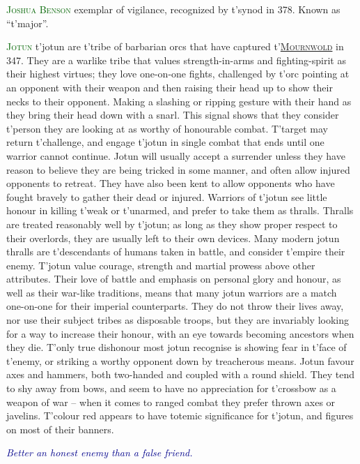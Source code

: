 \documentclass[twoside,11pt,b5paper,twocolumn]{scrbook}
\newcommand{\estcab}[1]{\textsc{\textcolor{marron}{#1}}}
\newcommand{\keyword}[1]{\textcolor{darkgreen}{#1}}
\renewcommand{\paragraph}[1]{\par\noindent\markboth{#1}{#1}\estcab{\keyword{#1}}\label{#1} }
\newcommand{\see}[1]{{\estcab{\hyperref[#1]{#1}}}}
\newcommand{\proverb}[1]{\par \textcolor{darkblue}{\itshape #1}}
\begin{document}
\paragraph{Joshua Benson} exemplar of vigilance, recognized by t'synod in 378. Known as “t'major”.
\paragraph{Jotun} t'jotun are t'tribe of barbarian orcs that have captured t'\see{Mournwold} in 347. They are a warlike tribe that values strength-in-arms and fighting-spirit as their highest virtues; they love one-on-one fights, challenged by t'orc pointing at an opponent with their weapon and then raising their head up to show their necks to their opponent. Making a slashing or ripping gesture with their hand as they bring their head down with a snarl. This signal shows that they consider t'person they are looking at as worthy of honourable combat. T'target may return t'challenge, and engage t'jotun in single combat that ends until one warrior cannot continue. Jotun will usually accept a surrender unless they have reason to believe they are being tricked in some manner, and often allow injured opponents to retreat. They have also been kent to allow opponents who have fought bravely to gather their dead or injured. Warriors of t'jotun see little honour in killing t'weak or t'unarmed, and prefer to take them as thralls. Thralls are treated reasonably well by t'jotun; as long as they show proper respect to their overlords, they are usually left to their own devices. Many modern jotun thralls are t'descendants of humans taken in battle, and consider t'empire their enemy. T'jotun value courage, strength and martial prowess above other attributes. Their love of battle and emphasis on personal glory and honour, as well as their war-like traditions, means that many jotun warriors are a match one-on-one for their imperial counterparts. They do not throw their lives away, nor use their subject tribes as disposable troops, but they are invariably looking for a way to increase their honour, with an eye towards becoming ancestors when they die. T'only true dishonour most jotun recognise is showing fear in t'face of t'enemy, or striking a worthy opponent down by treacherous means. Jotun favour axes and hammers, both two-handed and coupled with a round shield. They tend to shy away from bows, and seem to have no appreciation for t'crossbow as a weapon of war – when it comes to ranged combat they prefer thrown axes or javelins. T'colour red appears to have totemic significance for t'jotun, and figures on most of their banners. \proverb{Better an honest enemy than a false friend.}
\end{document}
